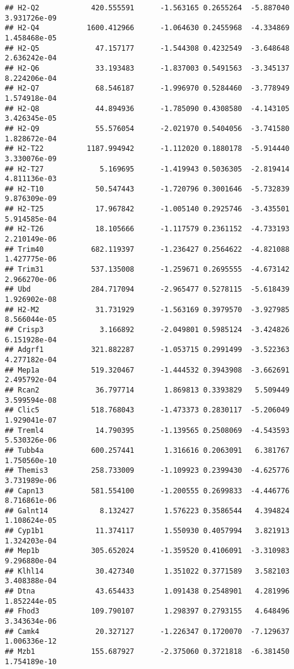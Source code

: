 \documentclass[
]{article}
\begin{document}
\begin{verbatim}
## H2-Q2            420.555591      -1.563165 0.2655264  -5.887040 3.931726e-09
## H2-Q4           1600.412966      -1.064630 0.2455968  -4.334869 1.458468e-05
## H2-Q5             47.157177      -1.544308 0.4232549  -3.648648 2.636242e-04
## H2-Q6             33.193483      -1.837003 0.5491563  -3.345137 8.224206e-04
## H2-Q7             68.546187      -1.996970 0.5284460  -3.778949 1.574918e-04
## H2-Q8             44.894936      -1.785090 0.4308580  -4.143105 3.426345e-05
## H2-Q9             55.576054      -2.021970 0.5404056  -3.741580 1.828672e-04
## H2-T22          1187.994942      -1.112020 0.1880178  -5.914440 3.330076e-09
## H2-T27             5.169695      -1.419943 0.5036305  -2.819414 4.811136e-03
## H2-T10            50.547443      -1.720796 0.3001646  -5.732839 9.876309e-09
## H2-T25            17.967842      -1.005140 0.2925746  -3.435501 5.914585e-04
## H2-T26            18.105666      -1.117579 0.2361152  -4.733193 2.210149e-06
## Trim40           682.119397      -1.236427 0.2564622  -4.821088 1.427775e-06
## Trim31           537.135008      -1.259671 0.2695555  -4.673142 2.966270e-06
## Ubd              284.717094      -2.965477 0.5278115  -5.618439 1.926902e-08
## H2-M2             31.731929      -1.563169 0.3979570  -3.927985 8.566044e-05
## Crisp3             3.166892      -2.049801 0.5985124  -3.424826 6.151928e-04
## Adgrf1           321.882287      -1.053715 0.2991499  -3.522363 4.277182e-04
## Mep1a            519.320467      -1.444532 0.3943908  -3.662691 2.495792e-04
## Rcan2             36.797714       1.869813 0.3393829   5.509449 3.599594e-08
## Clic5            518.768043      -1.473373 0.2830117  -5.206049 1.929041e-07
## Treml4            14.790395      -1.139565 0.2508069  -4.543593 5.530326e-06
## Tubb4a           600.257441       1.316616 0.2063091   6.381767 1.750560e-10
## Themis3          258.733009      -1.109923 0.2399430  -4.625776 3.731989e-06
## Capn13           581.554100      -1.200555 0.2699833  -4.446776 8.716861e-06
## Galnt14            8.132427       1.576223 0.3586544   4.394824 1.108624e-05
## Cyp1b1            11.374117       1.550930 0.4057994   3.821913 1.324203e-04
## Mep1b            305.652024      -1.359520 0.4106091  -3.310983 9.296880e-04
## Klhl14            30.427340       1.351022 0.3771589   3.582103 3.408388e-04
## Dtna              43.654433       1.091438 0.2548901   4.281996 1.852244e-05
## Fhod3            109.790107       1.298397 0.2793155   4.648496 3.343634e-06
## Camk4             20.327127      -1.226347 0.1720070  -7.129637 1.006336e-12
## Mzb1             155.687927      -2.375060 0.3721818  -6.381450 1.754189e-10

\end{verbatim}
\end{document}
